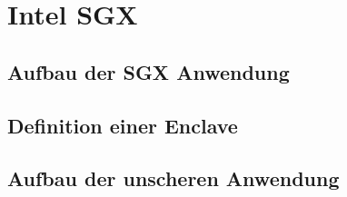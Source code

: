 
\chapter{Intel SGX}

\section{Aufbau der SGX Anwendung}

\section{Definition einer Enclave}

\section{Aufbau der unscheren Anwendung}